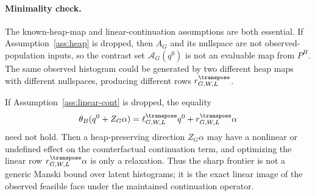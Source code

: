 \paragraph{Minimality check.}
The known-heap-map and linear-continuation assumptions are both essential.  If Assumption~\ref{ass:heap} is dropped, then \(A_G\) and its nullspace are not observed-population inputs, so the contrast set \(\mathcal{A}_G(q^0)\) is not an evaluable map from \(P^H\).  The same observed histogram could be generated by two different heap maps with different nullspaces, producing different rows \(r_{G,W,L}^{\transpose}\).

If Assumption~\ref{ass:linear-cont} is dropped, the equality
\[
\theta_B(q^0+Z_G\alpha)
=\ell_{G,W,L}^{\transpose}q^0+r_{G,W,L}^{\transpose}\alpha
\]
need not hold.  Then a heap-preserving direction \(Z_G\alpha\) may have a nonlinear or undefined effect on the counterfactual continuation term, and optimizing the linear row \(r_{G,W,L}^{\transpose}\alpha\) is only a relaxation.  Thus the sharp frontier is not a generic Manski bound over latent histograms; it is the exact linear image of the observed feasible face under the maintained continuation operator.
